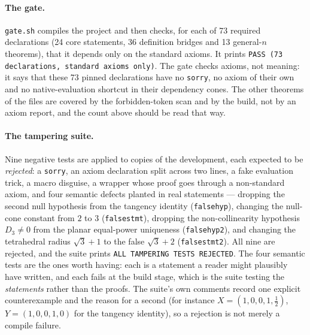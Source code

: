 \documentclass[11pt]{article}
\theoremstyle{definition}
\theoremstyle{remark}
\begin{document}
\paragraph{The gate.} \texttt{gate.sh} compiles the project and then checks, for each of 73 required
declarations (24 core statements, 36 definition bridges and 13 general-$n$ theorems), that it depends
only on the standard axioms. It prints \texttt{PASS (73 declarations, standard axioms only)}. The
gate checks axioms, not meaning: it says that these 73 pinned declarations have no \texttt{sorry},
no axiom of their own and no native-evaluation shortcut in their dependency cones. The other
theorems of the files are covered by the forbidden-token scan and by the build, not by an axiom
report, and the count above should be read that way.

\paragraph{The tampering suite.} Nine negative tests are applied to copies of the development, each
expected to be \emph{rejected}: a \texttt{sorry}, an axiom declaration split across two lines, a fake
evaluation trick, a macro disguise, a wrapper whose proof goes through a non-standard axiom, and four semantic defects
planted in real statements --- dropping the second null hypothesis from the tangency identity
(\texttt{falsehyp}), changing the null-cone constant from $2$ to $3$ (\texttt{falsestmt}), dropping
the non-collinearity hypothesis $D_3\neq0$ from the planar equal-power uniqueness
(\texttt{falsehyp2}), and changing the tetrahedral radius $\sqrt3+1$ to the false $\sqrt3+2$
(\texttt{falsestmt2}). All nine are rejected, and the suite prints
\texttt{ALL TAMPERING TESTS REJECTED}. The four semantic tests are the ones worth having: each is a
statement a reader might plausibly have written, and each fails at the build stage, which is the
suite testing the \emph{statements} rather than the proofs. The suite's own comments record one explicit
counterexample and the reason for a second (for instance $X=(1,0,0,1,\tfrac12)$,
$Y=(1,0,0,1,0)$ for the tangency identity), so a rejection is not merely a compile failure.
\end{document}
